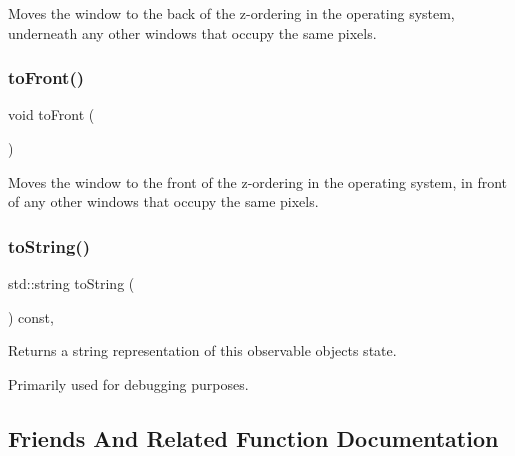 Moves the window to the back of the z-\/ordering in the operating system, underneath any other windows that occupy the same pixels. 

\mbox{\label{classGWindow_a48a9c646659814220ac869bbcb60b52c}} 
\subsubsection{\texorpdfstring{to\+Front()}{toFront()}}
{\footnotesize\ttfamily void to\+Front (\begin{DoxyParamCaption}{ }\end{DoxyParamCaption})\hspace{0.3cm}{\ttfamily [virtual]}}



Moves the window to the front of the z-\/ordering in the operating system, in front of any other windows that occupy the same pixels. 

\mbox{\label{classGObservable_a1fe5121d6528fdea3f243321b3fa3a49}} 
\subsubsection{\texorpdfstring{to\+String()}{toString()}}
{\footnotesize\ttfamily std\+::string to\+String (\begin{DoxyParamCaption}{ }\end{DoxyParamCaption}) const\hspace{0.3cm}{\ttfamily [virtual]}, {\ttfamily [inherited]}}



Returns a string representation of this observable object\textquotesingle{}s state. 

Primarily used for debugging purposes. 

\subsection{Friends And Related Function Documentation}
\mbox{\label{classGWindow_a054e99eaa992da5c1a77c8d7b3817788}} 
